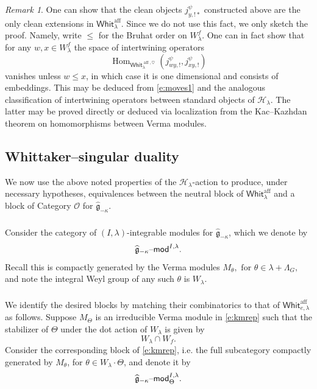 \documentclass[11pt,reqno]{amsart}
\newcommand{\sH}{\mathscr{H}}
\newcommand{\aff}{\operatorname{aff}}
\newcommand{\Hom}{\operatorname{Hom}}
\newcommand{\fg}{\mathfrak{g}}
\theoremstyle{remark}
\newtheorem{re}[subsubsection]{Remark}
\numberwithin{equation}{section}
\newcommand{\gmk}{\widehat{\fg}_{-\kappa}}
\renewcommand{\mod}{\text{\textendash}\mathsf{mod}}
\newcommand{\Whit}{\mathsf{Whit}}
\begin{document}
\begin{re} One can show that the clean objects $j_{y, !*}^\psi$ constructed 
above are the only clean extensions in $\Whit_{\lambda}^{\aff}$. Since we do 
not use this fact, we only sketch the proof. Namely, 
write $\leqslant$ for the Bruhat order on $W_\lambda^f$. One can in fact show 
that for any $w, x \in W_\lambda^f$ the space of intertwining operators
%
\[
\Hom_{\Whit_{\lambda}^{\aff, \heartsuit}}( j_{wy, !}^\psi, j_{xy, !}^\psi)
\]
%
vanishes unless $w \leqslant x$, in which case it is one dimensional and 
consists of embeddings. This may be deduced from \eqref{e:moves1} and the 
analogous classification of intertwining operators between standard objects 
of $\sH_\lambda$. The latter may be proved directly or deduced via localization 
from the Kac--Kazhdan theorem on homomorphisms between Verma modules. 
\end{re}


\subsection{Whittaker--singular duality}

We now use the above noted properties of the $\sH_\lambda$-action to produce, 
under 
necessary hypotheses, equivalences between the neutral block of 
$\Whit_{\lambda}^{\aff}$ 
and a block of Category $\mathscr{O}$ for $\gmk$. 


\subsubsection{} Consider the category of $(I, \lambda)$-integrable 
modules for $\gmk$, which we denote by 
%
\begin{equation} \label{e:kmrep}
 \widehat{\fg}_{-\kappa}\mod^{I, \lambda}.
\end{equation}
%
Recall this is compactly generated by the Verma modules $M_\theta,
\text{ for } \theta \in \lambda + \Lambda_G,$ and note the integral Weyl 
group of any such 
$\theta$ is $W_\lambda$. 


\subsubsection{} We identify the desired blocks by matching their combinatorics 
to that of $\Whit_{e, \lambda}^{\aff}$ as follows. Suppose $M_\Theta$ is 
an irreducible Verma module in \eqref{e:kmrep} such 
that the stabilizer of $\Theta$ under the dot action of $W_\lambda$ is 
given by 
%
\[ W_\lambda \cap W_f.
\]
%
Consider the corresponding block of \eqref{e:kmrep}, i.e. the full subcategory 
compactly generated by $M_{\theta}$, for $\theta \in W_\lambda \cdot \Theta$, 
and denote it by 
%
\[\widehat{\fg}_{-\kappa}\mod^{I, \lambda}_\Theta.\]
%
\end{document}

